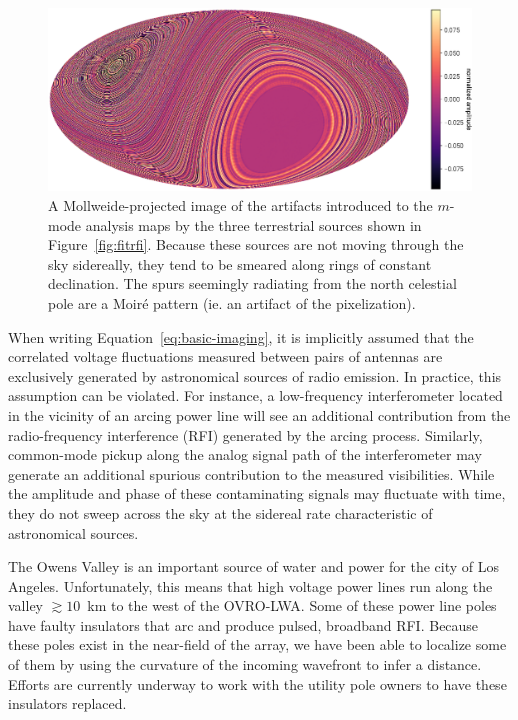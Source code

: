 \documentclass[twocolumn]{aastex61}
\begin{document}
\begin{figure}[t]
    \centering
    \includegraphics[height=0.32\textheight]{figures/terrestrial-interference/rings}
    \caption{
        A Mollweide-projected image of the artifacts introduced to the $m$-mode analysis maps by the
        three terrestrial sources shown in Figure~\ref{fig:fitrfi}. Because these sources are not
        moving through the sky sidereally, they tend to be smeared along rings of constant
        declination. The spurs seemingly radiating from the north celestial pole are a Moir\'{e}
        pattern (ie. an artifact of the pixelization).
    }
    \label{fig:rings}
\end{figure}

When writing Equation~\ref{eq:basic-imaging}, it is implicitly assumed that the correlated voltage
fluctuations measured between pairs of antennas are exclusively generated by astronomical sources of
radio emission. In practice, this assumption can be violated. For instance, a low-frequency
interferometer located in the vicinity of an arcing power line will see an additional contribution
from the radio-frequency interference (RFI) generated by the arcing process. Similarly, common-mode
pickup along the analog signal path of the interferometer may generate an additional spurious
contribution to the measured visibilities. While the amplitude and phase of these contaminating
signals may fluctuate with time, they do not sweep across the sky at the sidereal rate
characteristic of astronomical sources.

The Owens Valley is an important source of water and power for the city of Los Angeles.
Unfortunately, this means that high voltage power lines run along the valley $\gtrsim10$~km to the
west of the OVRO-LWA. Some of these power line poles have faulty insulators that arc and produce
pulsed, broadband RFI. Because these poles exist in the near-field of the array, we have been able
to localize some of them by using the curvature of the incoming wavefront to infer a distance.
Efforts are currently underway to work with the utility pole owners to have these insulators
replaced.
\end{document}

